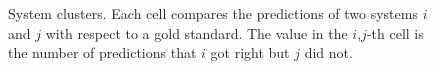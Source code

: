\documentclass[11pt,letterpaper]{article}
\begin{document}
\begin{figure}
	\caption{System clusters. Each cell compares the predictions of two systems $i$ and $j$ with respect to a gold standard. The value in the $i$,$j$-th cell is the number of predictions that $i$ got right but $j$ did not.}
	\label{fig:system-clusters}
\end{figure}
\end{document}
